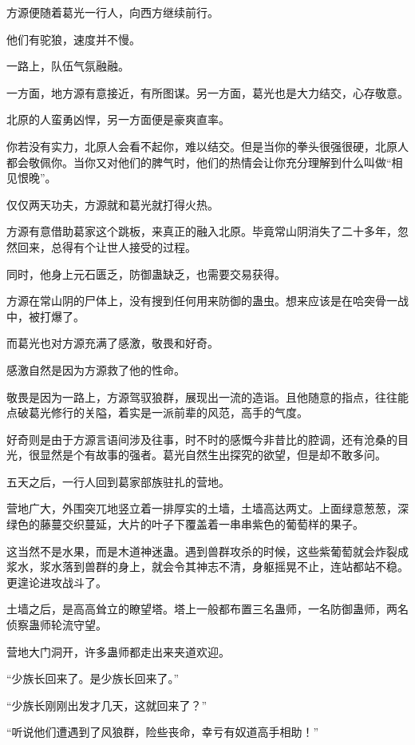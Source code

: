 
\begin{this_body}

方源便随着葛光一行人，向西方继续前行。

他们有驼狼，速度并不慢。

一路上，队伍气氛融融。

一方面，地方源有意接近，有所图谋。另一方面，葛光也是大力结交，心存敬意。

北原的人蛮勇凶悍，另一方面便是豪爽直率。

你若没有实力，北原人会看不起你，难以结交。但是当你的拳头很强很硬，北原人都会敬佩你。当你又对他们的脾气时，他们的热情会让你充分理解到什么叫做“相见恨晚”。

仅仅两天功夫，方源就和葛光就打得火热。

方源有意借助葛家这个跳板，来真正的融入北原。毕竟常山阴消失了二十多年，忽然回来，总得有个让世人接受的过程。

同时，他身上元石匮乏，防御蛊缺乏，也需要交易获得。

方源在常山阴的尸体上，没有搜到任何用来防御的蛊虫。想来应该是在哈突骨一战中，被打爆了。

而葛光也对方源充满了感激，敬畏和好奇。

感激自然是因为方源救了他的性命。

敬畏是因为一路上，方源驾驭狼群，展现出一流的造诣。且他随意的指点，往往能点破葛光修行的关隘，着实是一派前辈的风范，高手的气度。

好奇则是由于方源言语间涉及往事，时不时的感慨今非昔比的腔调，还有沧桑的目光，很显然是个有故事的强者。葛光自然生出探究的欲望，但是却不敢多问。

五天之后，一行人回到葛家部族驻扎的营地。

营地广大，外围突兀地竖立着一排厚实的土墙，土墙高达两丈。上面绿意葱葱，深绿色的藤蔓交织蔓延，大片的叶子下覆盖着一串串紫色的葡萄样的果子。

这当然不是水果，而是木道神迷蛊。遇到兽群攻杀的时候，这些紫葡萄就会炸裂成浆水，浆水落到兽群的身上，就会令其神志不清，身躯摇晃不止，连站都站不稳。更遑论进攻战斗了。

土墙之后，是高高耸立的瞭望塔。塔上一般都布置三名蛊师，一名防御蛊师，两名侦察蛊师轮流守望。

营地大门洞开，许多蛊师都走出来夹道欢迎。

“少族长回来了。是少族长回来了。”

“少族长刚刚出发才几天，这就回来了？”

“听说他们遭遇到了风狼群，险些丧命，幸亏有奴道高手相助！”


\end{this_body}
